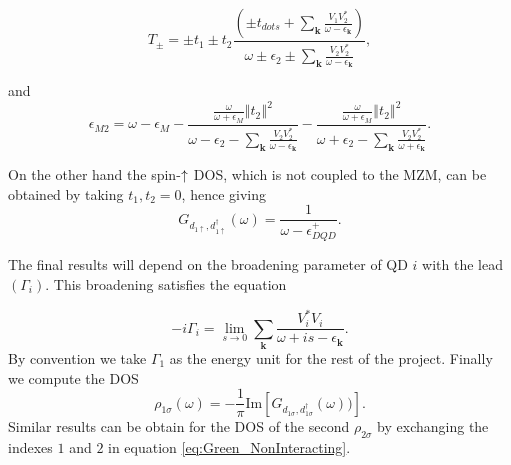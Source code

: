 \documentclass[showpacs,aps,prb,reprint,superscriptaddress]{revtex4-1}
\begin{document}
\begin{equation}
    T_{\pm}=\pm t_{1}\pm t_{2}\frac{\left(\pm t_{dots}+\sum_{\mathbf{k}}\frac{V_{1}V_{2}^{*}}{\omega-\epsilon_{\mathbf{k}}}\right)}{\omega\pm\epsilon_{2}\pm\sum_{\mathbf{k}}\frac{V_{2}V_{2}^{*}}{\omega-\epsilon_{\mathbf{k}}}}, \label{eq:T+-}
\end{equation}

\noindent and
\begin{equation}
    \epsilon_{M2}=\omega-\epsilon_{M}-\frac{\frac{\omega}{\omega+\epsilon_{M}}\left\Vert t_{2}\right\Vert ^{2} } {\omega-\epsilon_{2}-\sum_{\mathbf{k}}\frac{V_{2}V_{2}^{*}}{\omega-\epsilon_{\mathbf{k}}}}-\frac{\frac{\omega}{\omega+\epsilon_{M}}\left\Vert t_{2}\right\Vert ^{2}}{\omega+\epsilon_{2}-\sum_{\mathbf{k}}\frac{V_{2}V_{2}^{*}}{\omega+\epsilon_{\mathbf{k}}}}. \label{eq:M2}
\end{equation}




\noindent On the other hand the spin-$\uparrow$ DOS, which is not coupled to the MZM, can be obtained by taking $t_1,t_2 = 0$, hence giving
\begin{equation}
    G_{{d_{1\uparrow},d_{1\uparrow}^{\dagger}}}\left(\omega\right)=\frac{1}{\omega-\epsilon_{DQD}^{+}}.
    \label{eq:Green_NonInteracting}
\end{equation}


The final results will depend on the broadening parameter of QD $i$ with the lead $(\Gamma_i)$. This broadening satisfies the equation

\begin{equation}
   -i\Gamma_i = \lim_{s\rightarrow 0} \sum_{\boldsymbol{k}}\frac{V_{i}^{*}V_{i}}{\omega+ is -\epsilon_{\boldsymbol{k}}}.
\end{equation}
\noindent By convention we take $\Gamma_1$ as the energy unit for the rest of the project. Finally we compute the DOS 
\begin{equation}
    \rho_{1\sigma}(\omega)=-\frac{1}{\pi} \textrm{Im} \left[G_{d_{1\sigma},d_{1\sigma}^\dagger}(\omega))\right].
    \label{eq:Density of States}
\end{equation}
\noindent Similar results can be obtain for the DOS of the second $\rho_{2\sigma}$ by exchanging the indexes $1$ and $2$ in equation \eqref{eq:Green_NonInteracting}. 
\end{document}

